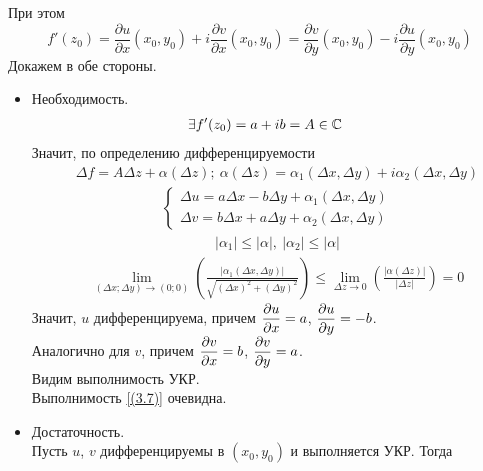 При этом
\begin{equation}\label{(3.7)}
    f'(z_0) = \frac{\partial u}{\partial x}(x_0,y_0) + i\frac{\partial v}{\partial x}(x_0,y_0) = \frac{\partial v}{\partial y}(x_0,y_0) - i\frac{\partial u}{\partial y}(x_0,y_0)
\end{equation}
\pr
Докажем в обе стороны.
\begin{itemize}
    \item Необходимость.
    \begin{align*}
      & \exists f'(z_0) = a+ib = A \in \mathbb{C}
    \end{align*}
    Значит, по определению дифференцируемости
    \begin{align*}
      & \Delta f = A \Delta z + \alpha(\Delta z); \ \alpha(\Delta z) = \alpha_1(\Delta x, \Delta y) + i\alpha_2(\Delta x, \Delta y)
    \end{align*}
    \begin{align*}
      & \left\{ \begin{matrix}
              \Delta u = a \Delta x - b \Delta y + \alpha_1(\Delta x, \Delta y) \\
              \Delta v = b \Delta x + a \Delta y + \alpha_2(\Delta x, \Delta y)
          \end{matrix} \right.
    \end{align*}
    \begin{align*}
      & \left| \alpha_1 \right| \leq \left| \alpha \right|, \ \left| \alpha_2 \right| \leq \left| \alpha \right|
    \end{align*}
    \begin{align*}
      & \lim_{(\Delta x; \Delta y) \to (0;0)}\left( \frac{\left| \alpha_1(\Delta x, \Delta y) \right|}{\sqrt{\left( \Delta x \right)^2 + \left( \Delta y \right)^2}} \right) \leq \lim_{\Delta z \to 0}\left( \frac{\left| \alpha(\Delta z) \right|}{\left| \Delta z \right|} \right) = 0
    \end{align*}
    Значит, $u$ дифференцируема, причем $\displaystyle \frac{\partial u}{\partial x} =
    a$, $\displaystyle \frac{\partial u}{\partial y} = -b$.
    \\
    Аналогично для $v$, причем $\displaystyle \frac{\partial v}{\partial x} = b$, $\displaystyle
    \frac{\partial v}{\partial y} = a$.
    \\
    Видим выполнимость УКР.
    \\
    Выполнимость \eqref{(3.7)} очевидна.
    \item Достаточность.
    \\
    Пусть $u$, $v$ дифференцируемы в $(x_0,y_0)$ и выполняется УКР. Тогда

\end{itemize}
